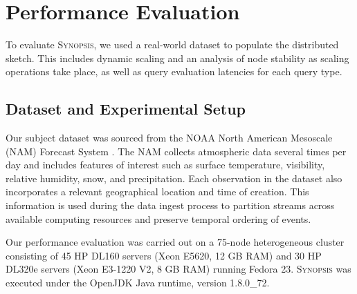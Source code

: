 \section{Performance Evaluation}
\label{sec:performance}
To evaluate \textsc{Synopsis}, we used a real-world dataset to populate the distributed sketch. This includes dynamic scaling and an analysis of node stability as scaling operations take place, as well as query evaluation latencies for each query type. \\

\subsection{Dataset and Experimental Setup}
Our subject dataset was sourced from the NOAA North American Mesoscale (NAM) Forecast System \cite{noaa_nam}.  The NAM collects atmospheric data several times per day and includes features of interest such as surface temperature, visibility, relative humidity, snow, and precipitation. Each observation in the dataset also incorporates a relevant geographical location and time of creation. This information is used during the data ingest process to partition streams across available computing resources and preserve temporal ordering of events.

Our performance evaluation was carried out on a 75-node heterogeneous cluster consisting of 45 HP DL160 servers (Xeon E5620, 12 GB RAM) and 30 HP DL320e servers (Xeon E3-1220 V2, 8 GB RAM) running Fedora 23. \textsc{Synopsis} was executed under the OpenJDK Java runtime, version 1.8.0\_72. \\

